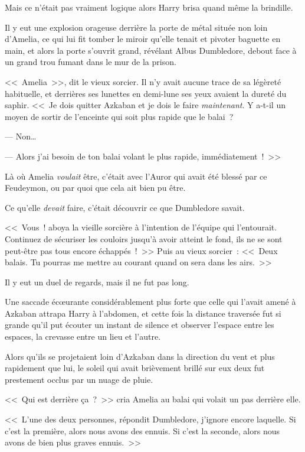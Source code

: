 Mais ce n'était pas vraiment logique alors Harry brisa quand même la brindille.

\later

Il y eut une explosion orageuse derrière la porte de métal située non loin d'Amelia, ce qui lui fit tomber le miroir qu'elle tenait et pivoter baguette en main, et alors la porte s'ouvrit grand, révélant Albus Dumbledore, debout face à un grand trou fumant dans le mur de la prison.

<<~Amelia~>>, dit le vieux sorcier. Il n'y avait aucune trace de sa légèreté habituelle, et derrières ses lunettes en demi-lune ses yeux avaient la dureté du saphir. <<~Je dois quitter Azkaban et je dois le faire \emph{maintenant}. Y a-t-il un moyen de sortir de l'enceinte qui soit plus rapide que le balai~?

--- Non…

--- Alors j'ai besoin de ton balai volant le plus rapide, immédiatement~!~>>

Là où Amelia \emph{voulait} être, c'était avec l'Auror qui avait été blessé par ce Feudeymon, ou par quoi que cela ait bien pu être.

Ce qu'elle \emph{devait} faire, c'était découvrir ce que Dumbledore savait.

<<~Vous~! aboya la vieille sorcière à l'intention de l'équipe qui l'entourait. Continuez de sécuriser les couloirs jusqu'à avoir atteint le fond, ils ne se sont peut-être pas tous encore échappés~!~>> Puis au vieux sorcier~: <<~Deux balais. Tu pourras me mettre au courant quand on sera dans les airs.~>>

Il y eut un duel de regards, mais il ne fut pas long.

\later

Une saccade écœurante considérablement plus forte que celle qui l'avait amené à Azkaban attrapa Harry à l'abdomen, et cette fois la distance traversée fut si grande qu'il put écouter un instant de silence et observer l'espace entre les espaces, la crevasse entre un lieu et l'autre.

\later

Alors qu'ils se projetaient loin d'Azkaban dans la direction du vent et plus rapidement que lui, le soleil qui avait brièvement brillé sur eux deux fut prestement occlus par un nuage de pluie.

<<~Qui est derrière ça~?~>> cria Amelia au balai qui volait un pas derrière elle.

<<~L'une des deux personnes, répondit Dumbledore, j'ignore encore laquelle. Si c'est la première, alors nous avons des ennuis. Si c'est la seconde, alors nous avons de bien plus graves ennuis.~>>

